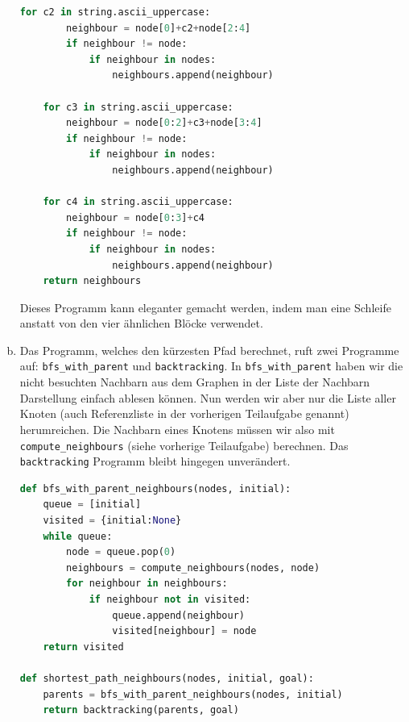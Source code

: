 \begin{enumerate}[(a)]
\begin{lstlisting}[language=Python]
    for c2 in string.ascii_uppercase:
        neighbour = node[0]+c2+node[2:4]
        if neighbour != node:
            if neighbour in nodes:
                neighbours.append(neighbour)
    
    for c3 in string.ascii_uppercase:
        neighbour = node[0:2]+c3+node[3:4]
        if neighbour != node:
            if neighbour in nodes:
                neighbours.append(neighbour)
                
    for c4 in string.ascii_uppercase:
        neighbour = node[0:3]+c4
        if neighbour != node:
            if neighbour in nodes:
                neighbours.append(neighbour)
    return neighbours
    \end{lstlisting}
    Dieses Programm kann eleganter gemacht werden, indem man eine Schleife anstatt von den vier ähnlichen Blöcke verwendet.
    
    \item Das Programm, welches den kürzesten Pfad berechnet, ruft zwei Programme auf: \texttt{bfs\_with\_parent} und \texttt{backtracking}. In \texttt{bfs\_with\_parent} haben wir die nicht besuchten Nachbarn aus dem Graphen in der Liste der Nachbarn Darstellung einfach ablesen können. Nun werden wir aber nur die Liste aller Knoten (auch Referenzliste in der vorherigen Teilaufgabe genannt) herumreichen. Die Nachbarn eines Knotens müssen wir also mit \texttt{compute\_neighbours} (siehe vorherige Teilaufgabe) berechnen. Das \texttt{backtracking} Programm bleibt hingegen unverändert.
    \begin{lstlisting}[language=Python]
def bfs_with_parent_neighbours(nodes, initial):
    queue = [initial]
    visited = {initial:None}
    while queue:
        node = queue.pop(0)
        neighbours = compute_neighbours(nodes, node)
        for neighbour in neighbours:
            if neighbour not in visited:
                queue.append(neighbour)
                visited[neighbour] = node
    return visited
    
def shortest_path_neighbours(nodes, initial, goal):
    parents = bfs_with_parent_neighbours(nodes, initial)
    return backtracking(parents, goal)
    \end{lstlisting}  
\end{enumerate}

